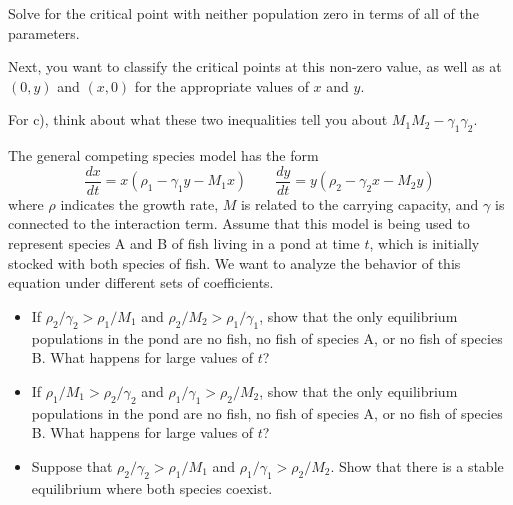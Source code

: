 \documentclass{ximera}
\begin{document}
\begin{exercise}
    \begin{hint}
         Solve for the critical point with neither population zero in terms of all of the parameters.
    \end{hint}
    \begin{hint}
         Next, you want to classify the critical points at this non-zero value, as well as at $(0, y)$ and $(x,0)$ for the appropriate values of $x$ and $y$.
    \end{hint}
    \begin{hint}
         For c), think about what these two inequalities tell you about $M_1M_2 - \gamma_1\gamma_2$.
    \end{hint}

    The general competing species model has the form
    \[ 
        \frac{dx}{dt} = x(\rho_1 - \gamma_1 y - M_1 x) \qquad \frac{dy}{dt} = y(\rho_2 - \gamma_2 x - M_2 y) 
    \] 
    where $\rho$ indicates the growth rate, $M$ is related to the carrying capacity, and $\gamma$ is connected to the interaction term. Assume that this model is being used to represent species A and B of fish living in a pond at time $t$, which is initially stocked with both species of fish. We want to analyze the behavior of this equation under different sets of coefficients.
    \begin{itemize}
        \item If $\rho_2/\gamma_2 > \rho_1/M_1$ and $\rho_2/M_2 > \rho_1/\gamma_1$, show that the only equilibrium populations in the pond are no fish, no fish of species A, or no fish of species B. What happens for large values of $t$?
        \item If $ \rho_1/M_1 > \rho_2/\gamma_2 $ and $\rho_1/\gamma_1 > \rho_2/M_2$, show that the only equilibrium populations in the pond are no fish, no fish of species A, or no fish of species B. What happens for large values of $t$?
        \item Suppose that $\rho_2/\gamma_2 > \rho_1/M_1$ and $\rho_1/\gamma_1 > \rho_2/M_2$. Show that there is a stable equilibrium where both species coexist. 
    \end{itemize}
\end{exercise}
\end{document}
